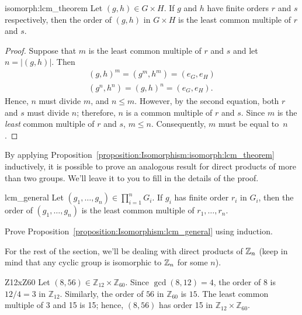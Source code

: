 \begin{prop}{isomorph:lcm_theorem}
Let $(g, h) \in G \times H$. If $g$ and $h$ have finite orders $r$ and
$s$ respectively, then the order of $(g, h)$ in $G \times H$ is the
least common multiple of $r$ and $s$. 
\end{prop}

 
\begin{proof}
Suppose that $m$ is the least common multiple of $r$ and $s$ and let
$n = |(g,h)|$. Then 
\begin{gather*}
(g,h)^m  = (g^m, h^m) = (e_G,e_H) \\
(g^n, h^n)  = (g, h)^n = (e_G,e_H).
\end{gather*}
Hence, $n$ must divide $m$, and $n \leq m$.  However, by the second
equation, both $r$ and $s$ must divide $n$; therefore, $n$ is a common
multiple of $r$ and $s$. Since $m$ is the {\em least} common multiple
of $r$ and $s$, $m \leq n$.  Consequently, $m$ must be equal to~$n$.
\end{proof}

By applying Proposition~\ref{proposition:Isomorphism:isomorph:lcm_theorem} inductively, it is possible to prove an analogous result for direct products of more than two groups. We'll leave it to you to fill in the details of the proof.

\begin{prop}{lcm_general}
Let $(g_1, \ldots, g_n) \in \prod_{i=1}^n  G_i$. If $g_i$ has finite order
$r_i$ in $G_i$, then the order of $(g_1, \ldots, g_n)$ 
is the least common multiple of $r_1, \ldots, r_n$.
\end{prop}
 
\begin{exercise}{}
Prove Proposition~\ref{proposition:Isomorphism:lcm_general} using induction.
\end{exercise}

 
 For the rest of the section, we'll be dealing with direct products of $\mathbb{Z}_n$ (keep in mind that any cyclic group is isomorphic to $\mathbb{Z}_n$ for some $n$). 

\begin{example}{Z12xZ60}
Let $(8, 56) \in {\mathbb Z}_{12} \times  {\mathbb Z}_{60}$. Since
$\gcd(8,12) = 4$, the order of 8 is $12/4 = 3$ in ${\mathbb Z}_{12}$.
Similarly, the order of $56$ in ${\mathbb Z}_{60}$ is $15$. The least
common multiple of 3 and 15 is 15; hence, $(8, 56)$ has order 15 in
${\mathbb Z}_{12} \times  {\mathbb Z}_{60}$.
\end{example}

